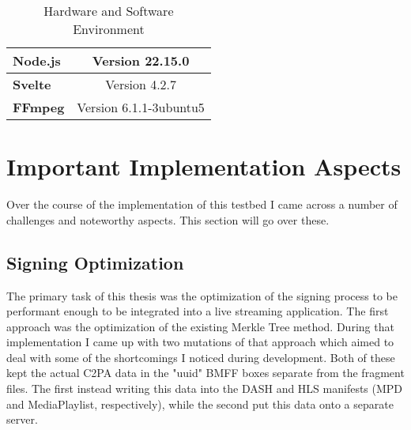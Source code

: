 \begin{table}[H]
\begin{tabular}{l|lll|}
        \multicolumn{1}{|l|}{\textbf{Node.js}}                                                     & \multicolumn{3}{c|}{Version 22.15.0}                                                                                                                                                                                                                  \\ \hline
        \multicolumn{1}{|l|}{\textbf{Svelte}}                                                      & \multicolumn{3}{c|}{Version 4.2.7}                                                                                                                                                                                                                    \\ \hline
        \multicolumn{1}{|l|}{\textbf{FFmpeg}}                                                      & \multicolumn{3}{c|}{Version 6.1.1-3ubuntu5}                                                                                                                                                                                                           \\ \hline
    \end{tabular}
    \caption{Hardware and Software Environment}
    \label{tab:env}
\end{table}

\section{Important Implementation Aspects\label{sec:implaspects}}

Over the course of the implementation of this testbed I came across a number of challenges and noteworthy aspects. This section will go over these.

\subsection{Signing Optimization\label{sec:optimization}}

The primary task of this thesis was the optimization of the signing process to be performant enough to be integrated into a live streaming application. The first approach was the optimization of the existing Merkle Tree method. During that implementation I came up with two mutations of that approach which aimed to deal with some of the shortcomings I noticed during development. Both of these kept the actual C2PA data in the "uuid" BMFF boxes separate from the fragment files. The first instead writing this data into the DASH and HLS manifests (MPD and MediaPlaylist, respectively), while the second put this data onto a separate server.

